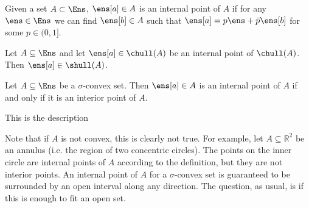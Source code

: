 \begin{defn}
	Given a set $A \subset \Ens$, $\ens[a] \in A$ is an internal point of $A$ if for any $\ens \in \Ens$ we can find $\ens[b] \in A$ such that $\ens[a] = p \ens + \bar{p} \ens[b]$ for some $p \in (0,1]$.
\end{defn}

\begin{conj}
	 Let $A \subseteq \Ens$ and let $\ens[a] \in \chull(A)$ be an internal point of $\chull(A)$. Then $\ens[a] \in \shull(A)$.
\end{conj}

\begin{conj}\label{interiorIsInternal}
	Let $A \subseteq \Ens$ be a $\sigma$-convex set. Then $\ens[a] \in A$ is an internal point of $A$ if and only if it is an interior point of $A$.
\end{conj}

{This is the description}


\begin{remark}
	Note that if $A$ is not convex, this is clearly not true. For example, let $A \subseteq \mathbb{R}^2$ be an annulus (i.e. the region of two concentric circles). The points on the inner circle are internal points of $A$ according to the definition, but they are not interior points. An internal point of $A$ for a $\sigma$-convex set is guaranteed to be surrounded by an open interval along any direction. The question, as usual, is if this is enough to fit an open set.
\end{remark}
